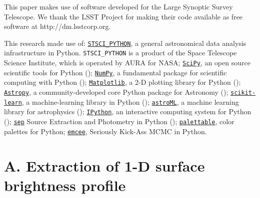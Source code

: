 \documentclass{emulateapj}
\begin{document}
\begin{CJK*}{UTF8}{gbsn}
  This paper makes use of software developed for the Large Synoptic Survey 
  Telescope. We thank the LSST Project for making their code available as free 
  software at http://dm.lsstcorp.org.
 
  This research made use of:
  \href{http://www.stsci.edu/institute/software_hardware/pyraf/stsci\_python}{\texttt{STSCI\_PYTHON}},
      a general astronomical data analysis infrastructure in Python. 
      \texttt{STSCI\_PYTHON} is a product of the Space Telescope Science Institute, 
      which is operated by AURA for NASA;
  \href{http://www.scipy.org/}{\texttt{SciPy}},
      an open source scientific tools for Python (\citealt{SciPy});
  \href{http://www.numpy.org/}{\texttt{NumPy}}, 
      a fundamental package for scientific computing with Python (\citealt{NumPy});
  \href{http://matplotlib.org/}{\texttt{Matplotlib}}, 
      a 2-D plotting library for Python (\citealt{Matplotlib});
  \href{http://www.astropy.org/}{\texttt{Astropy}}, a community-developed 
      core Python package for Astronomy (\citealt{AstroPy}); 
  \href{http://scikit-learn.org/stable/index.html}{\texttt{scikit-learn}},
      a machine-learning library in Python (\citealt{scikit-learn}); 
  \href{http://www.astroml.org/}{\texttt{astroML}}, 
      a machine learning library for astrophysics (\citealt{astroML});
  \href{https://ipython.org}{\texttt{IPython}}, 
      an interactive computing system for Python (\citealt{IPython});
  \href{https://github.com/kbarbary/sep}{\texttt{sep}} 
      Source Extraction and Photometry in Python (\citealt{PythonSEP});
  \href{https://jiffyclub.github.io/palettable/}{\texttt{palettable}},
      color palettes for Python;
  \href{http://dan.iel.fm/emcee/current/}{\texttt{emcee}}, 
      Seriously Kick-Ass MCMC in Python.





\appendix


\section{A. Extraction of 1-D surface brightness profile} 
    \label{app:A}


\end{CJK*}
\end{document}
